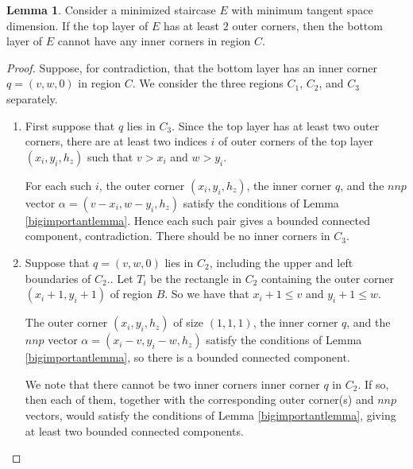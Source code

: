\documentclass{amsart}[10pt]
\theoremstyle{plain}
\theoremstyle{definition}
\newtheorem{lemma}[theorem]{Lemma}
\begin{document}
\begin{lemma}
\label{nocornerinC}
Consider a minimized staircase $E$ with minimum tangent space dimension. If the top layer of $E$ has at least $2$ outer corners, then the bottom layer of $E$ cannot have any inner corners in region $C$.
\end{lemma}

\begin{proof}
Suppose, for contradiction, that the bottom layer has an inner corner $q=(v,w,0)$ in region $C$. We consider the three regions $C_1$, $C_2$, and $C_3$ separately.

\begin{enumerate}
\item 
First suppose that $q$ lies in $C_3$. Since the top layer has at least two outer corners, there are at least two indices $i$ of outer corners of the top layer $(x_i, y_i, h_z)$ such that $v > x_i$ and $w > y_i$.

For each such $i$, the outer corner $(x_i,y_i,h_z)$, the inner corner $q$, and the $nnp$ vector $\alpha=(v-x_i, w-y_i, h_z)$ satisfy the conditions of Lemma \ref{bigimportantlemma}. Hence each such pair gives a bounded connected component, contradiction. There should be no inner corners in $C_3$.


\item
Suppose that $q=(v,w,0)$ lies in $C_2$, including the upper and left boundaries of $C_2$.. Let $T_i$ be the rectangle in $C_2$ containing the outer corner $(x_i+1,y_i+1)$ of region $B$. So we have that $x_i +1\leq v$ and $y_i +1 \leq w$. 

The outer corner  $(x_i,y_i, h_z)$ of size $(1,1,1)$, the inner corner $q$, and the $nnp$ vector $\alpha=(x_i-v,y_i-w, h_z)$ satisfy the conditions of Lemma \ref{bigimportantlemma}, so there is a bounded connected component. 

We note that there cannot be two inner corners inner corner $q$ in $C_2$. If so, then each of them, together with the corresponding outer corner(s) and $nnp$ vectors, would satisfy the conditions of Lemma \ref{bigimportantlemma}, giving at least two bounded connected components.%


\end{enumerate}
\end{proof}
\end{document}
